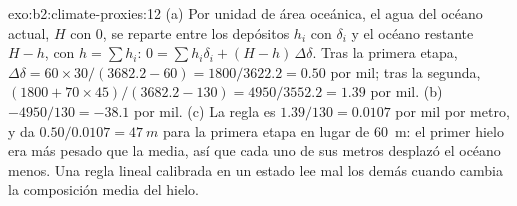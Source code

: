 \begin{solution}{exo:b2:climate-proxies:12}
(a) Por unidad de área oceánica, el agua del océano actual, $H$ con 0, se reparte entre los depósitos
$h_i$ con $\delta_i$ y el océano restante $H - h$, con $h = \sum h_i$: $0 = \sum h_i\delta_i +
(H - h)\,\Delta\delta$. Tras la primera etapa, $\Delta\delta = 60 \times 30/(3682.2 - 60) =
1800/3622.2 = 0.50$ por mil; tras la segunda, $(1800 + 70 \times 45)/(3682.2 - 130) =
4950/3552.2 = 1.39$ por mil. (b) $-4950/130 = -38.1$ por mil. (c) La regla es $1.39/130 = 0.0107$
por mil por metro, y da $0.50/0.0107 = \qty{47}{m}$ para la primera etapa en lugar de
\qty{60}{m}: el primer hielo era más pesado que la media, así que cada uno de sus metros desplazó el océano
menos. Una regla lineal calibrada en un estado lee mal los demás cuando cambia la composición media del
hielo.
\end{solution}

